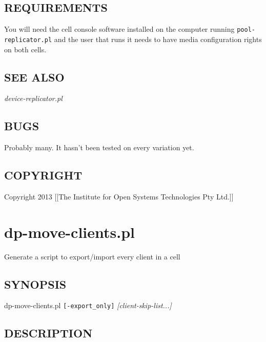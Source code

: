\documentclass{article}
\begin{document}
\subsection*{REQUIREMENTS\label{pool-replicator_pl_REQUIREMENTS}}


You will need the cell console software installed on the computer running
\texttt{pool-replicator.pl} and the user that runs it needs to have media configuration
rights on both cells.

\subsection*{SEE ALSO\label{pool-replicator_pl_SEE_ALSO}}


\emph{device-replicator.pl}

\subsection*{BUGS\label{pool-replicator_pl_BUGS}}


Probably many. It hasn't been tested on every variation yet.

\subsection*{COPYRIGHT\label{pool-replicator_pl_COPYRIGHT}}


Copyright 2013 [[The Institute for Open Systems Technologies Pty Ltd.]]

\clearpage
\section{dp-move-clients.pl\label{dp-move-clients_pl}}


Generate a script to export/import every client in a cell

\subsection*{SYNOPSIS\label{dp-move-clients_pl_SYNOPSIS}}


dp-move-clients.pl \texttt{[-export\_only]} \textit{[client-skip-list...]}

\subsection*{DESCRIPTION\label{dp-move-clients_pl_DESCRIPTION}}
\end{document}
